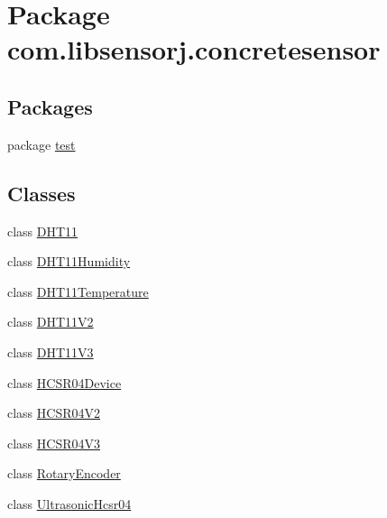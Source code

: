 \hypertarget{namespacecom_1_1libsensorj_1_1concretesensor}{}\section{Package com.\+libsensorj.\+concretesensor}
\label{namespacecom_1_1libsensorj_1_1concretesensor}
\subsection*{Packages}
\begin{DoxyCompactItemize}
\item 
package \hyperlink{namespacecom_1_1libsensorj_1_1concretesensor_1_1test}{test}
\end{DoxyCompactItemize}
\subsection*{Classes}
\begin{DoxyCompactItemize}
\item 
class \hyperlink{classcom_1_1libsensorj_1_1concretesensor_1_1DHT11}{D\+H\+T11}
\item 
class \hyperlink{classcom_1_1libsensorj_1_1concretesensor_1_1DHT11Humidity}{D\+H\+T11\+Humidity}
\item 
class \hyperlink{classcom_1_1libsensorj_1_1concretesensor_1_1DHT11Temperature}{D\+H\+T11\+Temperature}
\item 
class \hyperlink{classcom_1_1libsensorj_1_1concretesensor_1_1DHT11V2}{D\+H\+T11\+V2}
\item 
class \hyperlink{classcom_1_1libsensorj_1_1concretesensor_1_1DHT11V3}{D\+H\+T11\+V3}
\item 
class \hyperlink{classcom_1_1libsensorj_1_1concretesensor_1_1HCSR04Device}{H\+C\+S\+R04\+Device}
\item 
class \hyperlink{classcom_1_1libsensorj_1_1concretesensor_1_1HCSR04V2}{H\+C\+S\+R04\+V2}
\item 
class \hyperlink{classcom_1_1libsensorj_1_1concretesensor_1_1HCSR04V3}{H\+C\+S\+R04\+V3}
\item 
class \hyperlink{classcom_1_1libsensorj_1_1concretesensor_1_1RotaryEncoder}{Rotary\+Encoder}
\item 
class \hyperlink{classcom_1_1libsensorj_1_1concretesensor_1_1UltrasonicHcsr04}{Ultrasonic\+Hcsr04}
\end{DoxyCompactItemize}
